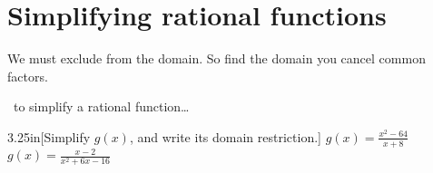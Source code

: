 \section{Simplifying rational functions}

\begin{myCenteredBox}[width=4in,]
    We must exclude  from the domain.
    So find the domain  you cancel common factors.
\end{myCenteredBox}

\begin{myConceptSteps}{~to simplify a rational function\dots}
\end{myConceptSteps}


\begin{my2Problems}{3.25in}[Simplify $g(x)$, and write its domain restriction.]
    {
        $g(x) = \frac{x^2 - 64}{x+8}$
    }
    {
        $g(x) = \frac{x-2}{x^2 + 6x -16}$
    }
\end{my2Problems}



